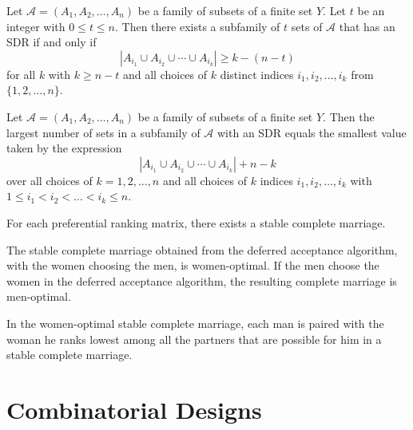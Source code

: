\begin{theorem}
  \label{thm:9.2.3}
  Let $\mathcal{A} = (A_1, A_2 ,\ldots , A_n)$ be a family of subsets of a finite set $Y$. Let $t$ 
  be an integer with $0 \leq t \leq n$. Then there exists a subfamily of $t$ sets of $\mathcal{A}$ 
  that has an SDR if and only if
  \begin{equation}\label{9.2}
    \left|A_{i_1} \cup A_{i_2} \cup \cdots \cup A_{i_k}\right| \geq k - (n -t) 
  \end{equation}
  for all $k$ with $k \geq n-t$ and all choices of $k$ distinct indices $i_1, i_2, \ldots, i_k$ 
  from $\{1,2, \ldots, n\}$.
\end{theorem}

\begin{theorem}
  \label{thm:9.2.4}
  Let $\mathcal{A} = (A_1, A_2 ,\ldots , A_n)$ be a family of subsets of a finite set $Y$. Then the 
  largest number of sets in a subfamily of $\mathcal{A}$ with an SDR equals the smallest value taken
  by the expression
  \begin{equation}\label{9.4}
    \left|A_{i_1} \cup A_{i_2} \cup \cdots \cup A_{i_k}\right| + n -k
  \end{equation}
  over all choices of $k = 1,2, \ldots ,n$ and all choices of $k$ indices $i_1, i_2, \ldots, i_k$ 
  with $1 \leq i_1 < i_2 <\ldots< i_k \leq n$.
\end{theorem}

\begin{theorem}
  \label{thm:9.3.1}
  For each preferential ranking matrix, there exists a stable complete marriage.
\end{theorem}

\begin{theorem}
  \label{thm:9.3.2}
  The stable complete marriage obtained from the deferred acceptance algorithm, with the women 
  choosing the men, is women-optimal. If the men choose the women in the deferred acceptance 
  algorithm, the resulting complete marriage is men-optimal.
\end{theorem}

\begin{corollary}
  \label{cor:9.3.3}
  In the women-optimal stable complete marriage, each man is paired with the woman he ranks lowest 
  among all the partners that are possible for him in a stable complete marriage.
\end{corollary}

\chapter{Combinatorial Designs}

